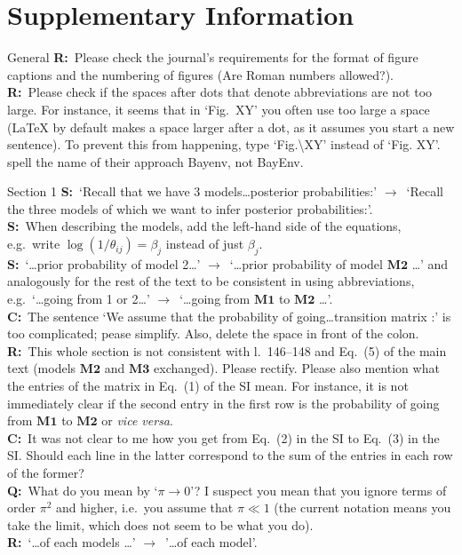 \documentclass[11pt]{article}
\newenvironment{my_description}
{\begin{description}
  \setlength{\itemsep}{2pt}
  \setlength{\parskip}{0pt}
  \setlength{\parsep}{0pt}}
{\end{description}}
\newcommand{\ra}{$\rightarrow$\ }
\newcommand{\C}{\textbf{C:}\ }
\newcommand{\Q}{\textbf{Q:}\ }
\newcommand{\R}{\textbf{R:}\ }
\newcommand{\V}{\textbf{S:}\ }
\begin{document}
\section{Supplementary Information}
\begin{my_description}

	\item[General] \R Please check the journal's requirements for the format of figure captions and the numbering of figures (Are Roman numbers allowed?).\\
	\R Please check if the spaces after dots that denote abbreviations are not too large. For instance, it seems that in `Fig.\ XY' you often use too large a space (LaTeX by default makes a space larger after a dot, as it assumes you start a new sentence). To prevent this from happening, type `Fig.\textbackslash XY' instead of `Fig. XY'.\\
	\cite{Guenther:2013ve} spell the name of their approach Bayenv, not BayEnv.
	
	\item[Section 1] \V `Recall that we have 3 models\dots posterior probabilities:' \ra `Recall the three models of which we want to infer posterior probabilities:'.\\
	\V When describing the models, add the left-hand side of the equations, e.g.\ write $\log{(1/\theta_{ij})} = \beta_j$ instead of just $\beta_j$.\\
	\V `\dots prior probability of model 2\dots' \ra `\dots prior probability of model $\mathbf{M2}$ \dots' and analogously for the rest of the text to be consistent in using abbreviations, e.g.\ `\dots going from 1 or 2\dots' \ra `\dots going from $\mathbf{M1}$ to $\mathbf{M2}$ \dots'.\\
	\C The sentence `We assume that the probability of going\dots transition matrix :' is too complicated; pease simplify. Also, delete the space in front of the colon.\\
	\R This whole section is not consistent with l.\ 146--148 and Eq.\ (5) of the main text (models $\mathbf{M2}$ and $\mathbf{M3}$ exchanged). Please rectify. Please also mention what the entries of the matrix in Eq.\ (1) of the SI mean. For instance, it is not immediately clear if the second entry in the first row is the probability of going from $\mathbf{M1}$ to $\mathbf{M2}$ or \emph{vice versa}.\\
	\C It was not clear to me how you get from Eq.\ (2) in the SI to Eq.\ (3) in the SI. Should each line in the latter correspond to the sum of the entries in each row of the former?\\
	\Q What do you mean by `$\pi \rightarrow 0$'? I suspect you mean that you ignore terms of order $\pi^2$ and higher, i.e.\ you assume that $\pi \ll 1$ (the current notation means you take the limit, which does not seem to be what you do).\\
	\R `\dots of each models \dots' \ra '\dots of each model'.
	

\end{my_description}
\end{document}
